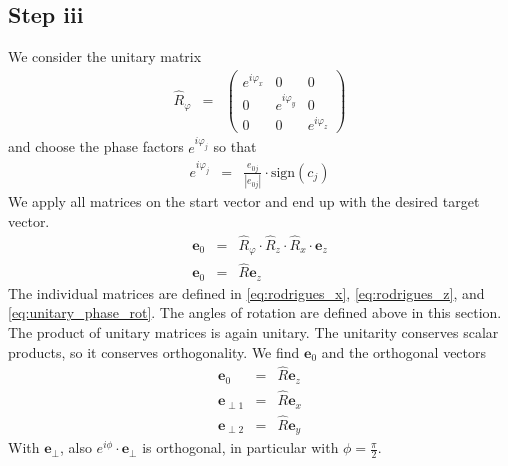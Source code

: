 \documentclass[12pt,a4paper,twoside,openright,BCOR10mm,headsepline,titlepage,abstracton,chapterprefix,final]{scrreprt}
\newcommand\Vector[1]{{\mathbf{#1}}}
\begin{document}
\subsection{Step iii}
We consider the unitary matrix
\begin{eqnarray}
 \hat{R}_\varphi &=&
 \begin{pmatrix}
  e^{i\varphi_x} & 0 & 0 \\
  0 & e^{i\varphi_y} & 0 \\
  0 & 0 & e^{i\varphi_z} 
 \end{pmatrix} \label{eq:unitary_phase_rot}
\end{eqnarray}
and choose the phase factors $e^{i \varphi_j}$ so that
\begin{eqnarray}
 e^{i \varphi_j} &=& \frac{e_{0j}}{|e_{0j}|} \cdot \text{sign}(c_j)
\end{eqnarray}
We apply all matrices on the start vector and end up with the desired target vector.
\begin{eqnarray}
 \Vector{e}_0 &=& \hat{R}_\varphi \cdot \hat{R}_z \cdot \hat{R}_x \cdot \Vector{e}_z \\[2ex]
 \Vector{e}_0 &=& \hat{R} \Vector{e}_z 
\end{eqnarray}
The individual matrices are defined in \eqref{eq:rodrigues_x}, \eqref{eq:rodrigues_z}, and \eqref{eq:unitary_phase_rot}.
The angles of rotation are defined above in this section.
The product of unitary matrices is again unitary.
The unitarity conserves scalar products, so it conserves orthogonality.
We find $\Vector{e}_0$ and the orthogonal vectors
\begin{eqnarray}
 \Vector{e}_0 &=& \hat{R} \Vector{e}_z \\
 \Vector{e}_{\perp1} &=& \hat{R} \Vector{e}_x \\
 \Vector{e}_{\perp2} &=& \hat{R} \Vector{e}_y
\end{eqnarray}
With $\Vector{e}_\perp$, also $e^{i\phi} \cdot \Vector{e}_\perp$ is orthogonal, in particular with $\phi = \tfrac{\pi}{2}$.
\end{document}
